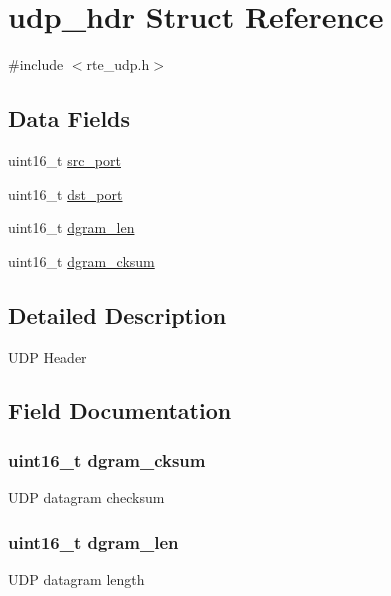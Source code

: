 \hypertarget{structudp__hdr}{}\section{udp\+\_\+hdr Struct Reference}
\label{structudp__hdr}


{\ttfamily \#include $<$rte\+\_\+udp.\+h$>$}

\subsection*{Data Fields}
\begin{DoxyCompactItemize}
\item 
uint16\+\_\+t \hyperlink{structudp__hdr_ab98974981cf4c143fcee028643f313e6}{src\+\_\+port}
\item 
uint16\+\_\+t \hyperlink{structudp__hdr_ae18defed4756b8c15e34718f51e86e55}{dst\+\_\+port}
\item 
uint16\+\_\+t \hyperlink{structudp__hdr_a747388563555906210041a6eb52a2705}{dgram\+\_\+len}
\item 
uint16\+\_\+t \hyperlink{structudp__hdr_ae0c0552d7f5d79ad5b0d77c892740c10}{dgram\+\_\+cksum}
\end{DoxyCompactItemize}


\subsection{Detailed Description}
U\+D\+P Header 

\subsection{Field Documentation}
\hypertarget{structudp__hdr_ae0c0552d7f5d79ad5b0d77c892740c10}{}
\subsubsection[{dgram\+\_\+cksum}]{\setlength{\rightskip}{0pt plus 5cm}uint16\+\_\+t dgram\+\_\+cksum}\label{structudp__hdr_ae0c0552d7f5d79ad5b0d77c892740c10}
U\+D\+P datagram checksum \hypertarget{structudp__hdr_a747388563555906210041a6eb52a2705}{}
\subsubsection[{dgram\+\_\+len}]{\setlength{\rightskip}{0pt plus 5cm}uint16\+\_\+t dgram\+\_\+len}\label{structudp__hdr_a747388563555906210041a6eb52a2705}
U\+D\+P datagram length \hypertarget{structudp__hdr_ae18defed4756b8c15e34718f51e86e55}{}
